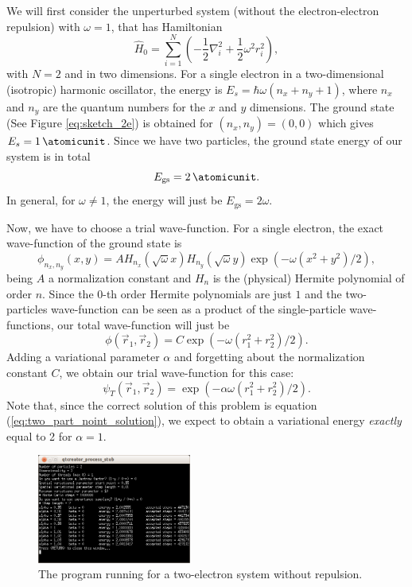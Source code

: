 \documentclass[a4paper,twoside,11pt]{book}
\begin{document}
We will first consider the unperturbed system (without the electron-electron repulsion) with $\omega = 1$, that has Hamiltonian
\begin{equation}
	\hat{H}_0 = 
	\sum_{i=1}^{N} \left( -\frac{1}{2}\nabla_i^2 + \frac{1}{2}\omega^2r_i^2 \right),
\end{equation}
with $N=2$ and in two dimensions. For a single electron in a two-dimensional (isotropic) harmonic oscillator, the energy is $E_s = \hbar\omega(n_x + n_y + 1)$, where $n_x$ and $n_y$ are the quantum numbers for the $x$ and $y$ dimensions. The ground state (See Figure \ref{eq:sketch_2e}) is obtained for $(n_x,n_y) = (0,0)$ which gives $E_s = \SI{1}{\atomicunit}$. Since we have two particles, the ground state energy of our system is in total
\begin{equation*}
	E_{\text{gs}} = \SI{2}{\atomicunit}.
\end{equation*}
In general, for $\omega \neq 1$, the energy will just be $E_{\text{gs}} = 2\omega$.

Now, we have to choose a trial wave-function. For a single electron, the exact wave-function of the ground state is
\begin{equation}
	\phi_{n_x,n_y}(x, y) = A H_{n_x}(\sqrt{\omega}x)H_{n_y}(\sqrt{\omega}y)\exp\left(-\omega\left(x^2 + y^2\right)/2\right),
	\label{eq:phi_qnums}
\end{equation}
being $A$ a normalization constant and $H_n$ is the (physical) Hermite polynomial of order $n$. Since the 0-th order Hermite polynomials are just $1$ and the two-particles wave-function can be seen as a product of the single-particle wave-functions, our total wave-function will just be
\begin{equation}
	\phi(\vec{r}_1,\vec{r}_2) = C \exp\left(-\omega\left(r_1^2 + r_2^2\right)/2\right).
	\label{eq:two_part_noint_solution}
\end{equation}
Adding a variational parameter $\alpha$ and forgetting about the normalization constant $C$, we obtain our trial wave-function for this case:
\begin{equation}
	\psi_T(\vec{r}_1,\vec{r}_2) = \exp\left(-\alpha\omega\left(r_1^2 + r_2^2\right)/2\right).
\end{equation}
Note that, since the correct solution of this problem is equation (\ref{eq:two_part_noint_solution}), we expect to obtain a variational energy \emph{exactly} equal to 2 for $\alpha = 1$.

\begin{figure}[H]
	\centering
	\includegraphics[width=0.45\textwidth]{two-part-non-int}
	\caption{The program running for a two-electron system without repulsion.}
	\label{fig:run_window_2e_no_rep}
\end{figure}
\end{document}
